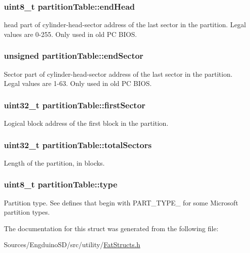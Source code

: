 \subsubsection[{end\+Head}]{\setlength{\rightskip}{0pt plus 5cm}uint8\+\_\+t partition\+Table\+::end\+Head}\label{structpartition_table_a4a3945bfd3a29f474984cb9f180dbd51}
head part of cylinder-\/head-\/sector address of the last sector in the partition. Legal values are 0-\/255. Only used in old P\+C B\+I\+O\+S. \hypertarget{structpartition_table_a27cdc4320c418ed0d833ab163ed77ad7}{}
\subsubsection[{end\+Sector}]{\setlength{\rightskip}{0pt plus 5cm}unsigned partition\+Table\+::end\+Sector}\label{structpartition_table_a27cdc4320c418ed0d833ab163ed77ad7}
Sector part of cylinder-\/head-\/sector address of the last sector in the partition. Legal values are 1-\/63. Only used in old P\+C B\+I\+O\+S. \hypertarget{structpartition_table_a02bbdff840c854dc96fa0b6da8589d86}{}
\subsubsection[{first\+Sector}]{\setlength{\rightskip}{0pt plus 5cm}uint32\+\_\+t partition\+Table\+::first\+Sector}\label{structpartition_table_a02bbdff840c854dc96fa0b6da8589d86}
Logical block address of the first block in the partition. \hypertarget{structpartition_table_acf96e59ce648a9a0cf35751c3b6d7730}{}
\subsubsection[{total\+Sectors}]{\setlength{\rightskip}{0pt plus 5cm}uint32\+\_\+t partition\+Table\+::total\+Sectors}\label{structpartition_table_acf96e59ce648a9a0cf35751c3b6d7730}
Length of the partition, in blocks. \hypertarget{structpartition_table_a3861cf276c728c4dd30ca04e74197ee8}{}
\subsubsection[{type}]{\setlength{\rightskip}{0pt plus 5cm}uint8\+\_\+t partition\+Table\+::type}\label{structpartition_table_a3861cf276c728c4dd30ca04e74197ee8}
Partition type. See defines that begin with P\+A\+R\+T\+\_\+\+T\+Y\+P\+E\+\_\+ for some Microsoft partition types. 

The documentation for this struct was generated from the following file\+:\begin{DoxyCompactItemize}
\item 
Sources/\+Engduino\+S\+D/src/utility/\hyperlink{_fat_structs_8h}{Fat\+Structs.\+h}\end{DoxyCompactItemize}
